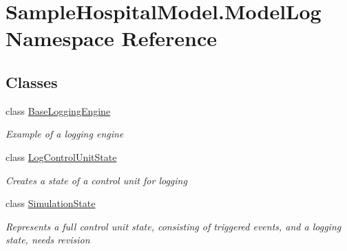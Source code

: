 \hypertarget{namespace_sample_hospital_model_1_1_model_log}{}\section{Sample\+Hospital\+Model.\+Model\+Log Namespace Reference}
\label{namespace_sample_hospital_model_1_1_model_log}
\subsection*{Classes}
\begin{DoxyCompactItemize}
\item 
class \hyperlink{class_sample_hospital_model_1_1_model_log_1_1_base_logging_engine}{Base\+Logging\+Engine}
\begin{DoxyCompactList}\small\item\em Example of a logging engine \end{DoxyCompactList}\item 
class \hyperlink{class_sample_hospital_model_1_1_model_log_1_1_log_control_unit_state}{Log\+Control\+Unit\+State}
\begin{DoxyCompactList}\small\item\em Creates a state of a control unit for logging \end{DoxyCompactList}\item 
class \hyperlink{class_sample_hospital_model_1_1_model_log_1_1_simulation_state}{Simulation\+State}
\begin{DoxyCompactList}\small\item\em Represents a full control unit state, consisting of triggered events, and a logging state, needs revision \end{DoxyCompactList}\end{DoxyCompactItemize}
